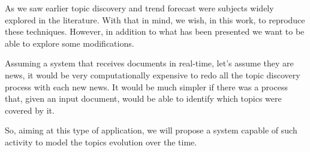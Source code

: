 As we saw earlier topic discovery and trend forecast were subjects widely explored in the literature. With that in mind, we wish, in this work, to reproduce these techniques. However, in addition to what has been presented we want to be able to explore some modifications.

Assuming a system that receives documents in real-time, let's assume they are news, it would be very computationally expensive to redo all the topic discovery process with each new news. It would be much simpler if there was a process that, given an input document, would be able to identify 
which topics were covered by it.

So, aiming at this type of application, we will propose a system capable of such activity to model the topics evolution over the time.


